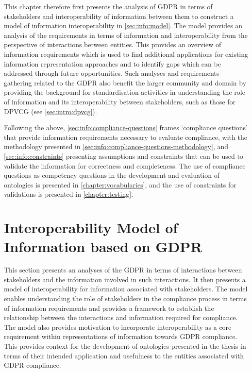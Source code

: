 This chapter therefore first presents the analysis of GDPR in terms of stakeholders and interoperability of information between them to construct a model of information interoperability in \autoref{sec:info:model}.
The model provides an analysis of the requirements in terms of information and interoperability from the perspective of interactions between entities.
This provides an overview of information requirements which is used to find additional applications for existing information representation approaches and to identify gaps which can be addressed through future opportunities.
Such analyses and requirements gathering related to the GDPR also benefit the larger community and domain by providing the background for standardisation activities in understanding the role of information and its interoperability between stakeholders, such as those for DPVCG (see \autoref{sec:intro:dpvcg}).

Following the above, \autoref{sec:info:compliance-questions} frames `compliance questions' that provide information requirements necessary to evaluate compliance, with the methodology presented in \autoref{sec:info:compliance-questions-methodology}, and \autoref{sec:info:constraints} presenting assumptions and constraints that can be used to validate the information for correctness and completeness.
The use of compliance questions as competency questions in the development and evaluation of ontologies is presented in \autoref{chapter:vocabularies}, and the use of constraints for validations is presented in \autoref{chapter:testing}.

\section{Interoperability Model of Information based on GDPR}\label{sec:info:model}
This section presents an analyses of the GDPR in terms of interactions between stakeholders and the information involved in such interactions. It then presents a model of interoperability for information associated with stakeholders. The model enables understanding the role of stakeholders in the compliance process in terms of information requirements and provides a framework to establish the relationship between the interactions and information required for compliance. 
The model also provides motivation to incorporate interoperability as a core requirement within representations of information towards GDPR compliance.
This provides context for the development of ontologies presented in the thesis in terms of their intended application and usefulness to the entities associated with GDPR compliance.

